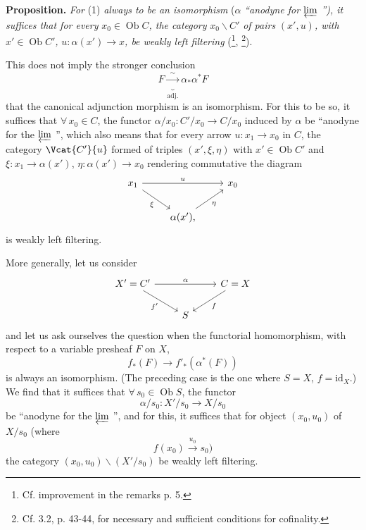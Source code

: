 \textbf{Proposition.} \textit{For} (1) \textit{always to be an isomorphism} ($\alpha$ \textit{``anodyne for} $\varprojlim$ \textit{''), it suffices that for every} $x_0 \in \operatorname{Ob} C$\textit{, the category} $x_0\backslash C'$ \textit{of pairs} $(x', u)$\textit{, with} $x' \in \operatorname{Ob} C'$\textit{,} $u : \alpha(x') \longrightarrow x$\textit{, be weakly left filtering} (\footnote{Cf. improvement in the remarks p. 5.}, \footnote{Cf. 3.2, p. 43-44, for necessary and sufficient conditions for cofinality.}). %

This does not imply the stronger conclusion
\[ F \underbrace{\xrightarrow{\;\sim\;}}_{\text{adj.}} \alpha_*\alpha^* F \]
that the canonical adjunction morphism is an isomorphism. For this to be so, it suffices that $\forall\, x_0 \in C$, the functor $\alpha/x_0 : C'/x_0 \longrightarrow C/x_0$ induced by $\alpha$ be ``anodyne for the $\varprojlim$ '', which also means that for every arrow $u : x_1 \longrightarrow x_0$ in $C$, the category $\Vcat{C'}{u}$ formed of triples $(x', \xi, \eta)$ with $x' \in \operatorname{Ob} C'$ and $\xi : x_1 \longrightarrow \alpha(x')$, $\eta : \alpha(x') \longrightarrow x_0$ rendering commutative
the diagram
\[
\begin{tikzcd}
x_1 \arrow[rr, "u"] \arrow[dr, "\xi"'] & & x_0 \\
 & \alpha(x'), \arrow[ur, "\eta"'] &
\end{tikzcd}
\]
is weakly left filtering.

More generally, let us consider
\[
\begin{tikzcd}
X' = C' \arrow[rr, "\alpha"] \arrow[dr, "f'"'] & & C = X \arrow[dl, "f"] \\
 & S &
\end{tikzcd}
\]
and let us ask ourselves the question when the functorial homomorphism, with respect to a variable presheaf $F$ on $X$,
\[ f_*(F) \longrightarrow f'_*(\alpha^*(F)) \]
is always an isomorphism. (The preceding case is the one where $S = X$, $f = \mathrm{id}_X$.) We find that it suffices that $\forall\, s_0 \in \operatorname{Ob} S$, the functor
\[ \alpha/s_0 : X'/s_0 \longrightarrow X/s_0 \]
be ``anodyne for the $\varprojlim$ '', and for this, it suffices that for object $(x_0, u_0)$ of $X/s_0$ (where
\[ f(x_0) \xrightarrow{u_0} s_0) \]
the category $(x_0, u_0)\backslash(X'/s_0)$ be weakly left filtering.

